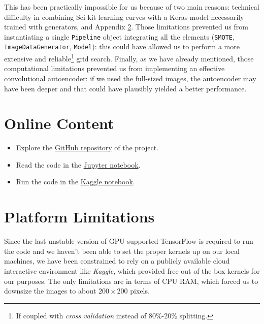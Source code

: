 \documentclass[aps,twocolumn,secnumarabic,nobalancelastpage,amsmath,amssymb,
nofootinbib]{revtex4}
\begin{document}
This has been practically impossible for us because of two main reasons: technical difficulty in combining Sci-kit learning curves with a Keras model necessarily trained with generators, and Appendix \ref{platform-limitations}. Those limitations prevented us from instantiating a single \texttt{Pipeline} object integrating all the elements (\texttt{SMOTE}, \texttt{ImageDataGenerator}, \texttt{Model}): this could have allowed us to perform a more extensive and reliable\footnote{If coupled with \emph{cross validation} instead of 80\%-20\% splitting.} grid search. Finally, as we have already mentioned, those computational limitations prevented us from implementing an effective convolutional autoencoder: if we used the full-sized images, the autoencoder may have been deeper and that could have plausibly yielded a better performance.


\appendix


\section{Online Content}\label{additional-material}

\begin{itemize}

\item
Explore the
\href{https://github.com/InPhyT/NeuralNetworksProject}{GitHub
	repository} of the project.
\vspace{-0.2cm}\item
Read the code in the
\href{https://nbviewer.jupyter.org/github/InPhyT/NeuralNetworksProject/Notebooks/notebook.ipynb}{Jupyter
	notebook}.
\vspace{-0.2cm}\item
Run the code in the
\href{https://www.kaggle.com/inphyt2020/neuralnetworksproject}{Kaggle
	notebook}.
\end{itemize}

\section{Platform Limitations}\label{platform-limitations}

Since the last unstable version of GPU-supported TensorFlow is required
to run the code and we haven't been able to set the proper kernels up on
our local machines, we have been constrained to rely on a publicly
available cloud interactive environment like \emph{Kaggle}, which
provided free out of the box kernels for our purposes. The only
limitations are in terms of CPU RAM, which forced us to downsize the
images to about $200 \times 200$ pixels.
\end{document}
